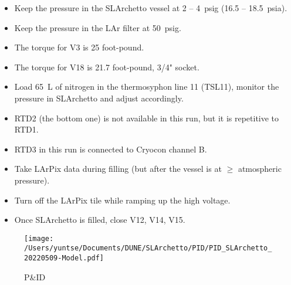 \documentclass[letterpaper,11pt]{article}
\begin{document}
\begin{itemize}
\item Keep the pressure in the SLArchetto vessel at 2 -- 4~psig (16.5 -- 18.5~psia).
\item Keep the pressure in the LAr filter at 50~psig.
\item The torque for V3 is 25 foot-pound.
\item The torque for V18 is 21.7 foot-pound, 3/4" socket.
\item Load 65~L of nitrogen in the thermosyphon line 11 (TSL11), monitor the pressure in SLArchetto and adjust accordingly.
\item RTD2 (the bottom one) is not available in this run, but it is repetitive to RTD1.
\item RTD3 in this run is connected to Cryocon channel B.
\item Take LArPix data during filling (but after the vessel is at $\ge$ atmospheric pressure).
\item Turn off the LArPix tile while ramping up the high voltage.
\item Once SLArchetto is filled, close V12, V14, V15.
\end{itemize}

\clearpage
\begin{figure}[htb]
\begin{center}
\texttt{[image: /Users/yuntse/Documents/DUNE/SLArchetto/PID/PID\_SLArchetto\_20220509-Model.pdf]}
\caption{P\&ID}
\end{center}
\end{figure}
\end{document}
